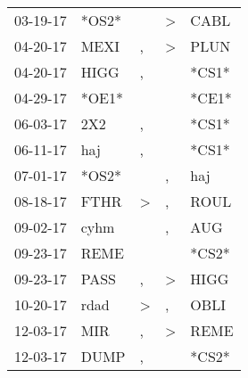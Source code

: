 \begin{supertabular}{p{0.07\textwidth}p{0.06\textwidth}p{0.02\textwidth}p{0.02\textwidth}p{0.06\textwidth}}
          03-19-17\textsuperscript{} &                            *OS2* &                  &     \textgreater &           CABL\textsuperscript{} \\
          04-20-17\textsuperscript{} &           MEXI\textsuperscript{} &                , &     \textgreater &           PLUN\textsuperscript{} \\
          04-20-17\textsuperscript{} &           HIGG\textsuperscript{} &                , &                  &                            *CS1* \\
          04-29-17\textsuperscript{} &                            *OE1* &                  &                  &                            *CE1* \\
          06-03-17\textsuperscript{} &            2X2\textsuperscript{} &                , &                  &                            *CS1* \\
          06-11-17\textsuperscript{} &            haj\textsuperscript{} &                , &                  &                            *CS1* \\
          07-01-17\textsuperscript{} &                            *OS2* &                  &                , &            haj\textsuperscript{} \\
          08-18-17\textsuperscript{} &           FTHR\textsuperscript{} &     \textgreater &                , &           ROUL\textsuperscript{} \\
          09-02-17\textsuperscript{} &           cyhm\textsuperscript{} &                  &                , &            AUG\textsuperscript{} \\
          09-23-17\textsuperscript{} &           REME\textsuperscript{} &                  &                  &                            *CS2* \\
          09-23-17\textsuperscript{} &           PASS\textsuperscript{} &                , &     \textgreater &           HIGG\textsuperscript{} \\
          10-20-17\textsuperscript{} &           rdad\textsuperscript{} &     \textgreater &                , &           OBLI\textsuperscript{} \\
          12-03-17\textsuperscript{} &            MIR\textsuperscript{} &                , &     \textgreater &           REME\textsuperscript{} \\
          12-03-17\textsuperscript{} &           DUMP\textsuperscript{} &                , &                  &                            *CS2* \\

\end{supertabular}
